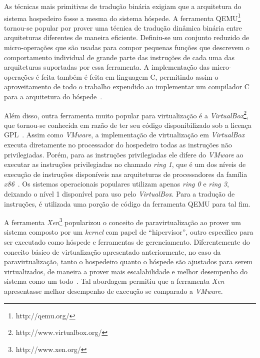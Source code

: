As técnicas mais primitivas de tradução binária exigiam que a arquitetura
do sistema hospedeiro fosse a mesma do sistema hóspede. A ferramenta
QEMU\footnote{http://qemu.org/} tornou-se popular por prover uma técnica de
tradução dinâmica binária entre arquiteturas diferentes de maneira
eficiente. Definiu-se um conjunto reduzido de micro-operações que
são usadas para compor pequenas funções que descrevem o comportamento
individual de grande parte das instruções de cada uma das arquiteturas
suportadas por essa ferramenta. A implementação das micro-operações é feita
também é feita em linguagem C, permitindo assim o aproveitamento de todo o
trabalho expendido ao implementar um compilador C para a arquitetura do
hóspede~\cite{bellard2005qemu}.

Além disso, outra ferramenta muito popular para virtualização é a
\emph{VirtualBox}\footnote{http://www.virtualbox.org/}, que tornou-se conhecida
em razão de ter seu código disponibilizado sob a licença
GPL~\cite{watson2008virtualbox}. Assim como \emph{VMware}, a implementação de
virtualização em \emph{VirtualBox} executa diretamente no processador do
hospedeiro todas as instruções não privilegiadas. Porém, para as instruções
privilegiadas ele difere do \emph{VMware} ao executar as instruções
privilegiadas no chamado \emph{ring 1}, que é um dos níveis de execução de
instruções disponíveis nas arquiteturas de processadores da família
\emph{x86}~\cite{uhlig2005intel}. Os sistemas operacionais populares utilizam
apenas \emph{ring 0} e \emph{ring 3}, deixando o nível 1 disponível para uso
pelo \emph{VirtualBox}. Para a tradução de instruções, é utilizada uma porção
de código da ferramenta QEMU para tal fim.~\cite{virtualboxTech}

A ferramenta \emph{Xen}\footnote{http://www.xen.org/} popularizou o conceito de
paravirtualização ao prover um sistema composto por um \emph{kernel} com papel
de “hipervisor”, outro específico para ser executado como hóspede e ferramentas
de gerenciamento. Diferentemente do conceito básico de virtualização
apresentado anteriormente, no caso da paravirtualização, tanto o hospedeiro
quanto o hóspede são ajustados para serem virtualizados, de maneira a prover
mais escalabilidade e melhor desempenho do sistema como um
todo~\cite{whitaker2002denali}. Tal abordagem permitiu que a ferramenta
\emph{Xen} apresentasse melhor desempenho de execução se comparado a
\emph{VMware}\cite{barham2003xen}.

